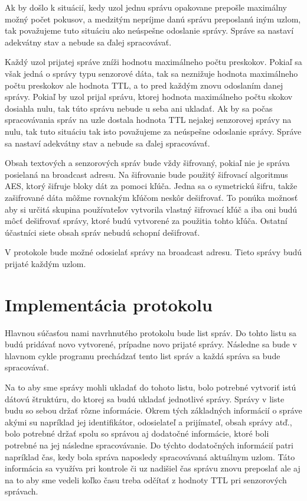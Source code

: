 \documentclass[slovak,master]{diploma}
\begin{document}
Ak by došlo k situácií, kedy uzol jednu správu opakovane prepošle maximálny možný počet pokusov, a medzitým nepríjme danú správu preposlanú iným uzlom, 
tak považujeme tuto situáciu ako neúspešne odoslanie správy. Správe sa nastaví adekvátny stav a nebude sa ďalej spracovávať.

Každý uzol prijatej správe zníži hodnotu maximálneho počtu preskokov. Pokiaľ sa však jedná o správy typu senzorové dáta, tak sa neznižuje hodnota maximálneho počtu preskokov 
ale hodnota TTL, a to pred každým znovu odoslaním danej správy. Pokiaľ by uzol prijal správu, ktorej hodnota maximálneho počtu skokov dosiahla nulu, tak túto 
správu nebude u seba ani ukladať. Ak by sa počas spracovávania správ na uzle dostala hodnota TTL nejakej senzorovej správy na nulu, tak tuto situáciu tak isto považujeme 
za neúspešne odoslanie správy. Správe sa nastaví adekvátny stav a nebude sa ďalej spracovávať.

Obsah textových a senzorových správ bude vždy šifrovaný, pokiaľ nie je správa posielaná na broadcast adresu. Na šifrovanie bude použitý šifrovací algoritmus AES, ktorý šifruje bloky dát za pomoci kľúča.
Jedna sa o symetrickú šifru, takže zašifrované dáta môžme rovnakým kľúčom neskôr dešifrovať. To ponúka možnosť aby si určitá skupina používateľov vytvorila vlastný 
šifrovací kľúč a iba oni budú môcť dešifrovať správy, ktoré budú vytvorené za použitia tohto kľúča. Ostatní účastníci siete obsah správ nebudú schopní dešifrovať.

V protokole bude možné odosielať správy na broadcast adresu. Tieto správy budú prijaté každým uzlom.

\section{Implementácia protokolu}
Hlavnou súčasťou nami navrhnutého protokolu bude list správ. Do tohto listu sa budú pridávať novo vytvorené, 
prípadne novo prijaté správy. Následne sa bude v hlavnom cykle programu prechádzať tento list správ a každá správa sa bude spracovávať.

Na to aby sme správy mohli ukladať do tohoto listu, bolo potrebné vytvoriť istú dátovú štruktúru, do ktorej sa budú ukladať jednotlivé správy.
Správy v liste budu so sebou držať rôzne informácie. Okrem tých základných informácií o správe akými su napríklad jej identifikátor, odosielateľ a prijímateľ, obsah správy atď., 
bolo potrebné držať spolu so správou aj dodatočné informácie, ktoré boli potrebné na jej následne spracovávanie. Do týchto dodatočných informácií patri napríklad 
čas, kedy bola správa naposledy spracovávaná aktuálnym uzlom. Táto informácia sa využíva pri kontrole či uz nadišiel čas správu znovu preposlať ale aj 
na to aby sme vedeli koľko času treba odčítať z hodnoty TTL pri senzorových správach.
\end{document}
